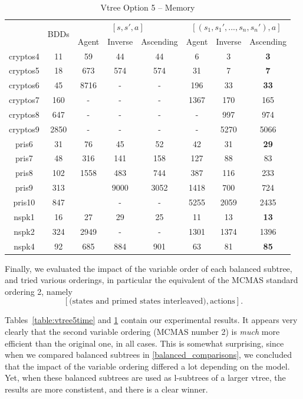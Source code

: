 \documentclass[11pt]{report}
\begin{document}
\begin{table}
\centering
\begin{tabular}{|*{8}{c|}}
\hline
& \multirow{2}{*}{BDDs} & \multicolumn{3}{c|}{$[s, s', a]$}& \multicolumn{3}{c|}{$[(s_1, s_1', ..., s_n, s_n'), a]$}\\ \cline{3-8}
& & Agent & Inverse & Ascending & Agent & Inverse & Ascending\\ \hline
cryptos4 & 11 & 59 & 44 & 44 & 6 & 3 &  \textbf{3}\\ \hline
cryptos5 & 18 & 673 & 574 & 574 &31 & 7 &  \textbf{7}\\ \hline
cryptos6 & 45 & 8716 & 
- & - & 196& 33 &  \textbf{33} \\ \hline
cryptos7 & 160 & - & - & - & 1367 & 170 & 165 \\ \hline
cryptos8 & 647 & - & - & - & - & 997 & 974\\ \hline
cryptos9 & 2850 & - & - & - & - & 5270 & 5066 \\ \hline
pris6 & 31 & 76 & 45 & 52 & 42&31&  \textbf{29}\\ \hline
pris7 & 48 & 316 & 141 & 158 & 127 &88 & 83\\ \hline
pris8 & 102 & 1558 & 483 & 744& 387 & 116 & 233\\ \hline
pris9 & 313 &  &9000  & 3052 & 1418 & 700 & 724\\ \hline
pris10 & 847 &  & - & - & 5255 & 2059 & 2435\\ \hline
nspk1 & 16 & 27 & 29 & 25  & 11 & 13 &\textbf{13} \\ \hline
nspk2 & 324 & 2949 & - & - & 1301 & 1374 & 1396 \\ \hline
nspk4 & 92 & 685 & 884 & 901& 63&81&  \textbf{85}\\ \hline
\end{tabular}
\caption{Vtree Option 5 -- Memory}
\label{table:vtree5memory}
\end{table}


Finally, we evaluated the impact of the variable order of each balanced subtree, and tried various orderings, in particular the equivalent of the MCMAS standard ordering 2, namely $$[\mbox{(states and primed states interleaved)}, \mbox{actions}].$$

Tables~\ref{table:vtree5time} and \ref{table:vtree5memory} contain our experimental results. It appears very clearly that the second variable ordering (MCMAS number 2) is \textit{much }more efficient than the original one, in all cases. This is somewhat surprising, since when we compared balanced subtrees in \ref{balanced_comparisons}, we concluded that the impact of the variable ordering differed a lot depending on the model. Yet, when these balanced subtrees are used as l-subtrees of a larger vtree, the results are more constistent, and there is a clear winner.
\end{document}
